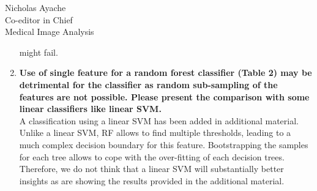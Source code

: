 \documentclass{letter}
\begin{document}
\begin{letter}{Nicholas Ayache \\ Co-editor in Chief \\ Medical Image Analysis}
\begin{enumerate}
    might fail.
  \item \textbf{Use of single feature for a random forest classifier
      (Table 2) may be detrimental for the classifier as random
      sub-sampling of the features are not possible. Please present
      the comparison with some linear classifiers like linear SVM.}\\
    A classification using a linear SVM has been added in additional
    material.
    Unlike a linear SVM, RF allows to find multiple thresholds,
    leading to a much complex decision boundary for this
    feature. Bootstrapping the samples for each tree allows to cope
    with the over-fitting of each decision trees. Therefore, we do not
    think that a linear SVM will substantially better insights as are
    showing the results provided in the additional material.
  \end{enumerate}


\end{letter}
\end{document}

